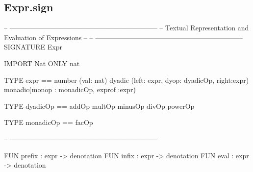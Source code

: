 \subsection{Expr.sign}
\begin{prog}
-- -----------------------------------------------------------------
--      Textual Representation and Evaluation of Expressions 
--                              
-- -----------------------------------------------------------------
SIGNATURE Expr

IMPORT Nat ONLY nat

TYPE  expr ==   number (val: nat)
                dyadic (left: expr, dyop: dyadicOp, right:expr)
                monadic(monop : monadicOp, exprof :expr)

TYPE dyadicOp == addOp multOp minusOp divOp powerOp

TYPE monadicOp == facOp

-- -----------------------------------------------------------------

FUN prefix : expr -> denotation
FUN infix : expr -> denotation
FUN eval : expr -> denotation
\end{prog}

